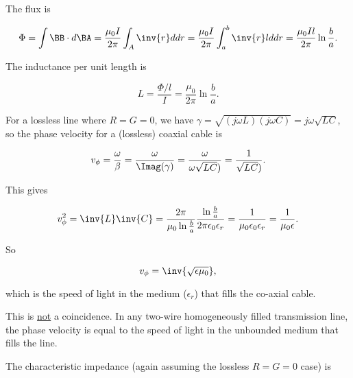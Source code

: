 {The flux is

\begin{dmath}\label{eqn:uwaves4TransmissionLines:400}
\Phi 
= \int \BB \cdot d\BA
= \frac{\mu_0 I}{ 2 \pi } \int_A \inv{r} d dr
= \frac{\mu_0 I}{ 2 \pi } \int_a^b \inv{r} l d dr
= \frac{\mu_0 I l}{ 2 \pi } \ln \frac{b}{a}.
\end{dmath}

The inductance per unit length is

\begin{equation}\label{eqn:uwaves4TransmissionLines:420}
L = \frac{\Phi/l}{I} = \frac{\mu_0}{ 2 \pi } \ln \frac{b}{a}.
\end{equation}


For a lossless line where \( R = G = 0 \), we have \( \gamma = \sqrt{ (j \omega L)(j \omega C)} = j \omega \sqrt{L C} \),
so the phase velocity for a (lossless) coaxial cable is

\begin{dmath}\label{eqn:uwaves4TransmissionLines:440}
v_\phi 
= \frac{\omega}{\beta} 
= \frac{\omega}{\Imag(\gamma)}
= \frac{\omega}{\omega \sqrt{LC})}
= \frac{1}{\sqrt{LC})}.
\end{dmath}

This gives

\begin{dmath}\label{eqn:uwaves4TransmissionLines:460}
v_\phi^2 
= \inv{ L }  \inv{C}
= 
\frac{ 2 \pi }{ \mu_0 \ln \frac{b}{a} }
\frac
{\ln \frac{b}{a}}
{2 \pi \epsilon_0 \epsilon_r }
=
\frac{1 }{ \mu_0 \epsilon_0 \epsilon_r }
=
\frac{1 }{ \mu_0 \epsilon }.
\end{dmath}

So

\begin{dmath}\label{eqn:uwaves4TransmissionLines:480}
v_\phi = \inv{\sqrt{\epsilon \mu_0}},
\end{dmath}

which is the speed of light in the medium (\(\epsilon_r\)) that fills the co-axial cable.

This is \underline{not} a coincidence.  In any two-wire homogeneously filled transmission line, the phase velocity is equal to the speed of light in the unbounded medium that fills the line.

The characteristic impedance (again assuming the lossless \( R = G = 0 \) case) is

}
